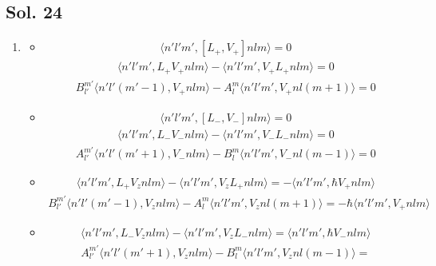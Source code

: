 \subsection*{Sol. 24}
\begin{enumerate}
    \item 
    \begin{itemize}
        \item 
        \begin{align*}
        \langle n'l'm',[L_+,V_+]nlm\rangle = 0
    \end{align*}
    \begin{align*}
        \langle n'l'm',L_+V_+nlm\rangle
        -\langle n'l'm',V_+L_+nlm\rangle= 0
    \end{align*}
    \begin{align*}
        B^{m'}_{l'}\langle n'l'(m'-1),V_+nlm\rangle
        -A^m_l\langle n'l'm',V_+nl(m+1)\rangle= 0
    \end{align*}
        \item 
        \begin{align*}
        \langle n'l'm',[L_-,V_-]nlm\rangle = 0
    \end{align*}
    \begin{align*}
        \langle n'l'm',L_-V_-nlm\rangle
        -\langle n'l'm',V_-L_-nlm\rangle= 0
    \end{align*}
    \begin{align*}
        A^{m'}_{l'}\langle n'l'(m'+1),V_-nlm\rangle
        -B^m_l\langle n'l'm',V_-nl(m-1)\rangle= 0
    \end{align*}
    \item 
        \begin{align*}
        \langle n'l'm',L_+V_znlm\rangle 
        -\langle n'l'm',V_zL_+nlm\rangle=
        -\langle n'l'm',\hbar V_+nlm\rangle
    \end{align*}
    \begin{align*}
        B^{m'}_{l'}\langle n'l'(m'-1),V_znlm\rangle 
        -A^m_l\langle n'l'm',V_znl(m+1)\rangle=
        -\hbar\langle n'l'm', V_+nlm\rangle
    \end{align*}
    \item 
        \begin{align*}
        \langle n'l'm',L_-V_znlm\rangle 
        -\langle n'l'm',V_zL_-nlm\rangle=
        \langle n'l'm',\hbar V_-nlm\rangle
    \end{align*}
    \begin{align*}
        A^{m'}_{l'}\langle n'l'(m'+1),V_znlm\rangle 
        -B^m_l\langle n'l'm',V_znl(m-1)\rangle=

\end{align*}
\end{itemize}
\end{enumerate}
